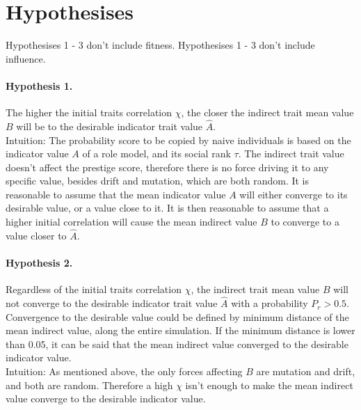 \documentclass[11pt]{article}
\begin{document}
\section*{Hypothesises}
Hypothesises 1 - 3 don't include fitness.
Hypothesises 1 - 3 don't include influence.
\paragraph{Hypothesis 1.} The higher the initial traits correlation $\chi$, the closer the indirect trait mean value $B$ will be to the desirable indicator trait value $\hat{A}$. \\
Intuition: The probability score to be copied by naive individuals is based on the indicator value $A$ of a role model, and its social rank $\tau$. 
The indirect trait value doesn't affect the prestige score, therefore there is no force driving it to any specific value, besides drift and mutation, which are both random.
It is reasonable to assume that the mean indicator value $A$ will either converge to its desirable value, or a value close to it.
It is then reasonable to assume that a higher initial correlation will cause the mean indirect value $B$ to converge to a value closer to $\hat{A}$.

\paragraph{Hypothesis 2.} Regardless of the initial traits correlation $\chi$, the indirect trait mean value $B$ will not converge to the desirable indicator trait value $\hat{A}$ with a probability $P_r > 0.5$.
Convergence to the desirable value could be defined by minimum distance of the mean indirect value, along the entire simulation. If the minimum distance is lower than 0.05, it can be said that the mean indirect value converged to the desirable indicator value.\\
Intuition: As mentioned above, the only forces affecting $B$ are mutation and drift, and both are random. 
Therefore a high $\chi$ isn't enough to make the mean indirect value converge to the desirable indicator value.
\end{document}
